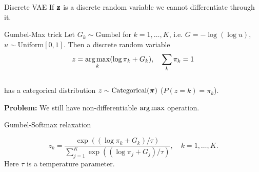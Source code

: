 \begin{frame}{Discrete VAE}
	If $\mathbf{z}$ is a discrete random variable we cannot differentiate through it.
	
	\begin{block}{Gumbel-Max trick}
		Let $G_k \sim \text{Gumbel}$ for $k = 1, \dots, K$, i.e. $G = - \log (\log u)$, $u \sim \text{Uniform}[0, 1]$. Then a discrete random variable
		\vspace{-0.2cm}
		\[
			z = \operatorname*{arg\,max}_k (\log \pi_k + G_k), \quad \sum_k \pi_k = 1
		\]
		\vspace{-0.5cm} \\
		has a categorical distribution $z \sim \text{Categorical}(\boldsymbol{\pi})$ ($P(z = k) = \pi_k$).
	\end{block}
	\textbf{Problem:} We still have non-differentiable $\operatorname*{arg\,max}$ operation.
	\begin{block}{Gumbel-Softmax relaxation}
		
		\[
			z_k = \frac{\exp ((\log \pi_k + G_k) / \tau)}{\sum_{j=1}^K \exp ((\log \pi_j + G_j) / \tau)}, \quad k = 1, \dots, K.
		\]
		Here $\tau$ is a temperature parameter.
 	\end{block}
\end{frame}%
